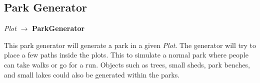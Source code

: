 \subsection{Park Generator}
\begin{center}
    \textit{Plot} $\rightarrow$ \textbf{ParkGenerator}                        
\end{center}
This park generator will generate a park in a given \textit{Plot}. 
The generator will try to place a few paths inside the plots. 
This to simulate a normal park where people can take walks or go for a run.
Objects such as trees, small sheds, park benches, and small lakes could also be generated within the parks.